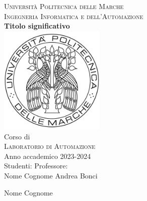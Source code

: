 \documentclass[11pt]{report}
\begin{document}


\begin{titlepage}
\begin{center}
\LARGE {\scshape{Università Politecnica delle Marche}}\\[0.5cm]
\LARGE {\scshape{Ingegneria Informatica e dell'Automazione}}\\[0.7cm]
\linespread{1}
\huge {\bfseries Titolo significativo }\\[1cm]
\linespread{1}
\includegraphics[width=5cm]{images/logoUnivpm.jpg}\\[0.5cm]
\linespread{1.2}
\Large Corso di\\
\Large {\scshape{Laboratorio di Automazione}} \\[0.3cm]
\Large {Anno accademico 2023-2024 \\[0.8cm]}
{\Large Studenti:}
\hfill {\Large Professore:}\\
{\Large Nome Cognome}
\hfill
{\Large Andrea Bonci}\\
\raggedright{\Large Nome Cognome\\}
\end{center}
\end{titlepage}

\tableofcontents
{}
\newpage
\end{document}
